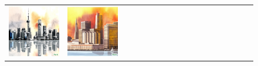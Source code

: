\begin{figure}[ht!]
\begin{adjustwidth}{-0.8in}{-0.5in}
\begin{tabular}{cccccccccccccccccccc}
\multicolumn{2}{c}{\includegraphics[width=\threebythreecolwidth\textwidth]{figures/cherries/ink_2_shanghai.jpg}} &
\multicolumn{2}{c}{\includegraphics[width=\threebythreecolwidth\textwidth]{figures/cherries/ink_3_sf.jpg}} \\


\end{tabular}
\end{adjustwidth}
\end{figure}
